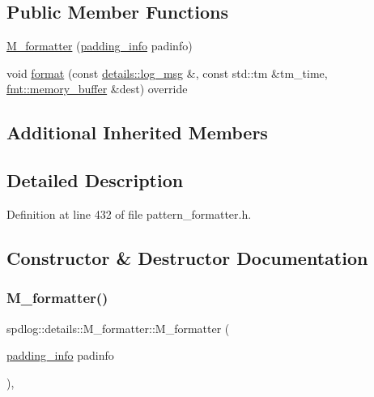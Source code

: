 \subsection*{Public Member Functions}
\begin{DoxyCompactItemize}
\item 
\hyperlink{classspdlog_1_1details_1_1_m__formatter_a6d27aa27b0ede646701b4b5138afe4cd}{M\+\_\+formatter} (\hyperlink{structspdlog_1_1details_1_1padding__info}{padding\+\_\+info} padinfo)
\item 
void \hyperlink{classspdlog_1_1details_1_1_m__formatter_ab6c0f013ea2c54cceb4561033d59ca0c}{format} (const \hyperlink{structspdlog_1_1details_1_1log__msg}{details\+::log\+\_\+msg} \&, const std\+::tm \&tm\+\_\+time, \hyperlink{format_8h_a21cbf729f69302f578e6db21c5e9e0d2}{fmt\+::memory\+\_\+buffer} \&dest) override
\end{DoxyCompactItemize}
\subsection*{Additional Inherited Members}


\subsection{Detailed Description}


Definition at line 432 of file pattern\+\_\+formatter.\+h.



\subsection{Constructor \& Destructor Documentation}
\mbox{\label{classspdlog_1_1details_1_1_m__formatter_a6d27aa27b0ede646701b4b5138afe4cd}} 
\subsubsection{\texorpdfstring{M\+\_\+formatter()}{M\_formatter()}}
{\footnotesize\ttfamily spdlog\+::details\+::\+M\+\_\+formatter\+::\+M\+\_\+formatter (\begin{DoxyParamCaption}\item[{\hyperlink{structspdlog_1_1details_1_1padding__info}{padding\+\_\+info}}]{padinfo }\end{DoxyParamCaption})\hspace{0.3cm}{\ttfamily [inline]}, {\ttfamily [explicit]}}



